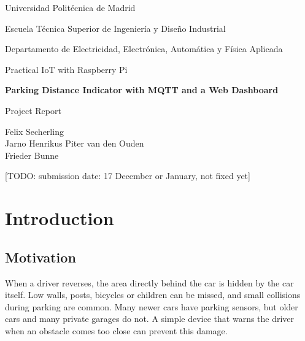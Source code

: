 \documentclass[11pt,a4paper]{article}
\newcommand{\todo}[1]{\textcolor{red!75!black}{[TODO: #1]}}
\newcommand{\projecttitle}{Parking Distance Indicator with MQTT and a Web Dashboard}
\newcommand{\coursename}{Practical IoT with Raspberry Pi}
\newcommand{\universityname}{Universidad Politécnica de Madrid}
\newcommand{\schoolname}{Escuela Técnica Superior de Ingeniería y Diseño Industrial}
\newcommand{\departmentname}{Departamento de Electricidad, Electrónica, Automática y Física Aplicada}
\newcommand{\teammembers}{%
  Felix Secherling\\
  Jarno Henrikus Piter van den Ouden\\
  Frieder Bunne}
\newcommand{\submissiondate}{\todo{submission date: 17 December or January, not fixed yet}}
\begin{document}
\begin{titlepage}
  \centering
  \vspace*{3cm}
  {\large \universityname\par}
  \vspace{0.3cm}
  {\schoolname\par}
  \vspace{0.1cm}
  {\departmentname\par}
  \vspace{0.8cm}
  {\large \coursename\par}
  \vspace{2.5cm}
  {\huge\bfseries \projecttitle\par}
  \vspace{0.6cm}
  {\Large Project Report\par}
  \vspace{2.5cm}
  {\large \teammembers\par}
  \vfill
  {\large \submissiondate\par}
\end{titlepage}

\begin{abstract}
  Reversing into a parking space or garage is difficult because obstacles behind
  the car are hard to see. We built a parking distance indicator based on a
  Raspberry Pi. An ultrasonic sensor measures the distance to the nearest
  obstacle. Three LEDs show a green, yellow or red warning, and a buzzer beeps
  faster as the obstacle gets closer. Every measurement is sent over MQTT to a
  web dashboard built with Flask, which shows a car reversing into a parking bay
  in real time. The user can change the warning thresholds and switch the buzzer
  on or off in the browser; the new settings reach the Raspberry Pi over MQTT.
  Tests in simulation confirmed the complete chain from the sensor to the browser
  and back. \todo{one sentence with the main hardware result, e.g.\ measured accuracy}
\end{abstract}

\tableofcontents
\clearpage

\section{Introduction}
\label{sec:introduction}

\subsection{Motivation}
When a driver reverses, the area directly behind the car is hidden by the car
itself. Low walls, posts, bicycles or children can be missed, and small
collisions during parking are common. Many newer cars have parking sensors, but
older cars and many private garages do not. A simple device that warns the
driver when an obstacle comes too close can prevent this damage.
\end{document}
